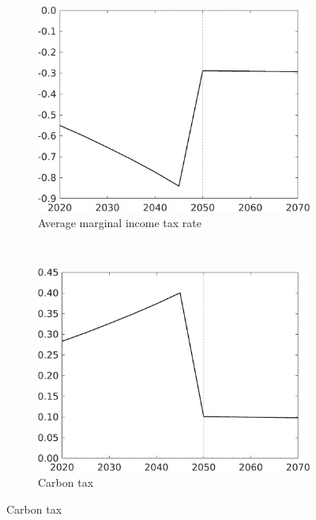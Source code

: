 \begin{figure}[h!!!]
	\centering
	\caption{Deviation of combined policy from carbon-tax-only: no knowledge spillovers}\label{fig:opt_TLs_noKN_app}
		\begin{subfigure}{0.4\textwidth}
		\caption{Average marginal income tax rate }
		\includegraphics[width=1\textwidth]{../../codding_model/own_basedOnFried/optimalPol_010922_revision/figures/all_13Sept22_Tplus30/dTaulAv_OPT_T_NoTaus_COMPtaul_regime4_spillover0_knspil1_noskill0_sep0_xgrowth0_PV1_etaa0.79_lgd0.png}
	\end{subfigure}
\begin{minipage}[]{0.1\textwidth}
	\
\end{minipage}
	\begin{subfigure}{0.4\textwidth}
		\caption{Carbon tax}
		\includegraphics[width=1\textwidth]{../../codding_model/own_basedOnFried/optimalPol_010922_revision/figures/all_13Sept22_Tplus30/Tauf_OPT_T_NoTaus_COMPtaulPer_regime4_spillover0_knspil1_noskill0_sep0_xgrowth0_PV1_etaa0.79.png}

\end{subfigure}
\end{figure}

